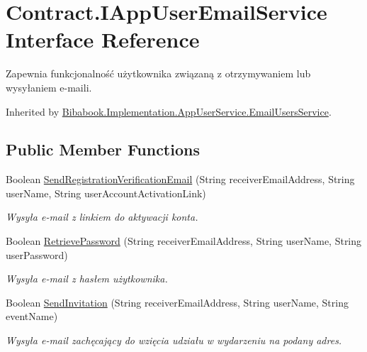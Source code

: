 \hypertarget{interface_contract_1_1_i_app_user_email_service}{}\section{Contract.\+I\+App\+User\+Email\+Service Interface Reference}
\label{interface_contract_1_1_i_app_user_email_service}


Zapewnia funkcjonalność użytkownika związaną z otrzymywaniem lub wysyłaniem e-\/maili.  




Inherited by \hyperlink{class_bibabook_1_1_implementation_1_1_app_user_service_1_1_email_users_service}{Bibabook.\+Implementation.\+App\+User\+Service.\+Email\+Users\+Service}.

\subsection*{Public Member Functions}
\begin{DoxyCompactItemize}
\item 
Boolean \hyperlink{interface_contract_1_1_i_app_user_email_service_a4bbb7699b06b20a7739024a875a250b9}{Send\+Registration\+Verification\+Email} (String receiver\+Email\+Address, String user\+Name, String user\+Account\+Activation\+Link)
\begin{DoxyCompactList}\small\item\em Wysyła e-\/mail z linkiem do aktywacji konta. \end{DoxyCompactList}\item 
Boolean \hyperlink{interface_contract_1_1_i_app_user_email_service_a50ce075711a10042ce7542982ce44dd8}{Retrieve\+Password} (String receiver\+Email\+Address, String user\+Name, String user\+Password)
\begin{DoxyCompactList}\small\item\em Wysyła e-\/mail z hasłem użytkownika. \end{DoxyCompactList}\item 
Boolean \hyperlink{interface_contract_1_1_i_app_user_email_service_aa76521307a455023a8565d077b74f2d7}{Send\+Invitation} (String receiver\+Email\+Address, String user\+Name, String event\+Name)
\begin{DoxyCompactList}\small\item\em Wysyła e-\/mail zachęcający do wzięcia udziału w wydarzeniu na podany adres. \end{DoxyCompactList}\end{DoxyCompactItemize}
